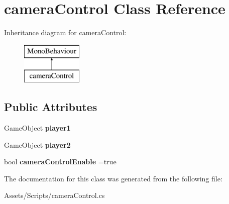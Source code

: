 \hypertarget{classcamera_control}{}\section{camera\+Control Class Reference}
\label{classcamera_control}
Inheritance diagram for camera\+Control\+:\begin{figure}[H]
\begin{center}
\leavevmode
\includegraphics[height=2.000000cm]{classcamera_control}
\end{center}
\end{figure}
\subsection*{Public Attributes}
\begin{DoxyCompactItemize}
\item 
Game\+Object {\bfseries player1}\hypertarget{classcamera_control_a0f0e859e0dd7a8e8b01684027339844f}{}\label{classcamera_control_a0f0e859e0dd7a8e8b01684027339844f}

\item 
Game\+Object {\bfseries player2}\hypertarget{classcamera_control_a611122e2cbfe588d75fec370adbab75f}{}\label{classcamera_control_a611122e2cbfe588d75fec370adbab75f}

\item 
bool {\bfseries camera\+Control\+Enable} =true\hypertarget{classcamera_control_ac77ad072b488e86a1ef004297ae7e117}{}\label{classcamera_control_ac77ad072b488e86a1ef004297ae7e117}

\end{DoxyCompactItemize}


The documentation for this class was generated from the following file\+:\begin{DoxyCompactItemize}
\item 
Assets/\+Scripts/camera\+Control.\+cs\end{DoxyCompactItemize}

